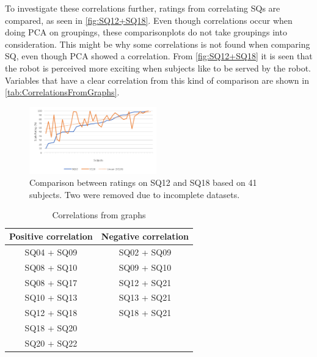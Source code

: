 To investigate these correlations further, ratings from correlating SQs are compared, as seen in \autoref{fig:SQ12+SQ18}. Even though correlations occur when doing PCA on groupings, these comparisonplots do not take groupings into consideration. This might be why some correlations is not found when comparing SQ, even though PCA showed a correlation. From \autoref{fig:SQ12+SQ18} it is seen that the robot is perceived more exciting when subjects like to be served by the robot. Variables that have a clear correlation from this kind of comparison are shown in \autoref{tab:CorrelationsFromGraphs}.
%
\begin{figure}[H]
	\centering
	\includegraphics[width = 0.49\textwidth]{Figure/SQ12+SQ18}
	\setlength{} 
	\caption{Comparison between ratings on SQ12 and SQ18 based on 41 subjects. Two were removed due to incomplete datasets.}
	\label{fig:SQ12+SQ18}
\end{figure}
\noindent
%
\begin{table}
	\centering
	\caption{Correlations from graphs}
	\label{tab:CorrelationsFromGraphs} 
	\begin{tabular}{ c|c }
		\centering
		Positive correlation & Negative correlation \\ \hline
		SQ04 + SQ09 & SQ02 + SQ09 \\ 
		SQ08 + SQ10 & SQ09 + SQ10 \\ 
		SQ08 + SQ17 & SQ12 + SQ21 \\ 
		SQ10 + SQ13 & SQ13 + SQ21 \\ 
		SQ12 + SQ18 & SQ18 + SQ21	\\	
		SQ18 + SQ20 & 							\\
		SQ20 + SQ22 & 
	\end{tabular}        
\end{table}
\noindent
%

